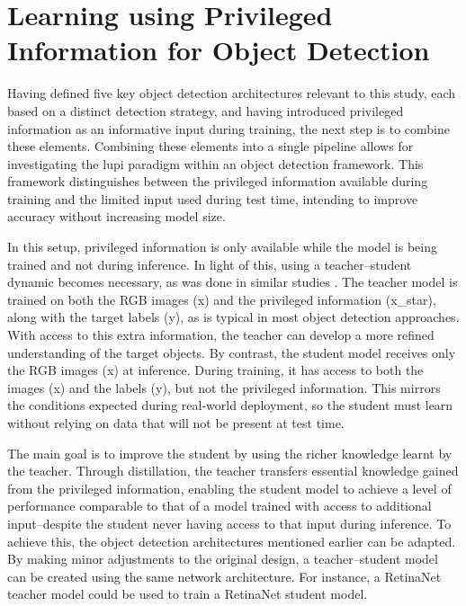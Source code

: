 
\section{Learning using Privileged Information for Object Detection}
\label{sec:4_lupi4od}

Having defined five key object detection architectures relevant to this study, each based on a distinct detection strategy, and having introduced privileged information as an informative input during training, the next step is to combine these elements. Combining these elements into a single pipeline allows for investigating the \gls{lupi} paradigm within an object detection framework. This framework distinguishes between the privileged information available during training and the limited input used during test time, intending to improve accuracy without increasing model size.

In this setup, privileged information is only available while the model is being trained and not during inference. In light of this, using a teacher–student dynamic becomes necessary, as was done in similar studies \cite{lab2wild, lupi_classification}. The teacher model is trained on both the RGB images (\gls{x}) and the privileged information (\gls{x_star}), along with the target labels (\gls{y}), as is typical in most object detection approaches. With access to this extra information, the teacher can develop a more refined understanding of the target objects.
By contrast, the student model receives only the RGB images (\gls{x}) at inference. During training, it has access to both the images (\gls{x}) and the labels (\gls{y}), but not the privileged information. This mirrors the conditions expected during real-world deployment, so the student must learn without relying on data that will not be present at test time.

The main goal is to improve the student by using the richer knowledge learnt by the teacher. Through distillation, the teacher transfers essential knowledge gained from the privileged information, enabling the student model to achieve a level of performance comparable to that of a model trained with access to additional input--despite the student never having access to that input during inference.
To achieve this, the object detection architectures mentioned earlier can be adapted. By making minor adjustments to the original design, a teacher–student model can be created using the same network architecture. For instance, a RetinaNet teacher model could be used to train a RetinaNet student model.

